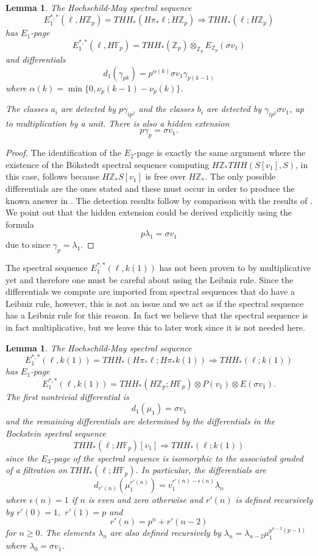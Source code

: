 \documentclass[12pt]{amsart}
\newcommand{\Z}{\mathbb{Z}}
\newcommand{\F}{\mathbb{F}}
\newtheorem{lem}[equation]{Lemma}
\theoremstyle{definition}
\numberwithin{equation}{section}
\numberwithin{figure}{section}
\begin{document}
\begin{lem}
The Hochschild-May spectral sequence
\[ E_1^{*,*}(\ell,H\Z_p)=THH_*(H\pi_*\ell;H\Z_p)\Rightarrow THH_*(\ell;H\Z_p)\]
has $E_1$-page
\[E_1^{*,*}(\ell,H\F_p)= THH_*(\Z_p)\otimes_{\Z_p} E_{\Z_p}(\sigma v_1)\]
and differentials 
\[ d_1(\gamma_{pk})=p^{\alpha(k)} \sigma v_1 \gamma_{p(k-1)}\]
where $\alpha(k)=\min\{0,\nu_p(k-1)-\nu_p(k)\}$.

The classes $a_i$ are detected by $p\gamma_{ip^2}$ and the classes $b_i$ are detected by $\gamma_{ip^2}\sigma v_1$, up to multiplication by a unit. There is also a hidden extension 
\[ p\gamma_p=\sigma v_1.\]
\end{lem}
\begin{proof}
The identification of the $E_2$-page is exactly the same argument where the existence of the B\"okstedt spectral sequence computing $H\Z_*THH(S[v_1],S)$, in this case, follows because $H\Z_*S[v_1]$ is free over $H\Z_*$. The only possible differentials are the ones stated and these must occur in order to produce the known answer in \cite{AHL}. The detection results follow by comparison with the results of \cite{AHL}. We point out that the hidden extension could be derived explicitly using the formula 
\[ p\lambda_1=\sigma v_1\]
due to \cite{Rog19} since $\gamma_p=\lambda_1$. 
\end{proof}
The spectral sequence $E_1^{*,*}(\ell,k(1))$ has not been proven to by multiplicative yet and therefore one must be careful about using the Leibniz rule. Since the differentials we compute are imported from spectral sequences that do have a Leibniz rule, however, this is not an issue and we act as if the spectral sequence has a Leibniz rule for this reason. In fact we believe that the spectral sequence is in fact multiplicative, but we leave this to later work since it is not needed here. 
\begin{lem}
The Hochschild-May spectral sequence
\[ E_1^{*,*}(\ell,k(1))=THH_*(H\pi_*\ell;H\pi_*k(1))\Rightarrow THH_*(\ell;k(1))\]
has $E_1$-page
\[ E_1^{*,*}(\ell,k(1))=THH_*(H\Z_p;H\F_p)\otimes P(v_1)\otimes E(\sigma v_1).\]
The first nontrivial differential is 
\[ d_{1}(\mu_1)=\sigma v_1 \]
and the remaining differentials are determined by the differentials in the Bockstein spectral sequence 
\[ THH_*(\ell;H\F_p)[v_1]\Rightarrow THH_*(\ell;k(1))\]
since the $E_3$-page of the spectral sequence is isomorphic to the associated graded of a filtration on $THH_*(\ell;H\F_p)$. In particular, the differentials are 
\[ d_{r'(n)}(\mu_1^{r'(n)})=v_1^{r'(n)-\epsilon(n)}\lambda_n\]
where $\epsilon(n)=1$ if $n$ is even and zero otherwise and $r'(n)$ is defined recursively by $r'(0)=1,$ $r'(1)=p$ and 
\[ r'(n)=p^n+r'(n-2)\]
for $n\ge 0$.
The elements $\lambda_n$ are also defined recursively by $\lambda_n=\lambda_{n-2}\mu_1^{p^{n-2}(p-1)}$ where $\lambda_0=\sigma v_1$.
\end{lem}
\end{document}
